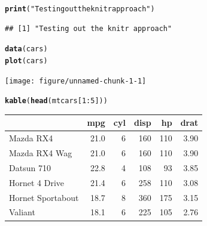 \documentclass[print]{faofactbook}\usepackage[]{graphicx}\usepackage[]{color}
\makeatletter
\newcommand{\hlnum}[1]{\textcolor[rgb]{0.686,0.059,0.569}{#1}}%
\newcommand{\hlstr}[1]{\textcolor[rgb]{0.192,0.494,0.8}{#1}}%
\newcommand{\hlopt}[1]{\textcolor[rgb]{0,0,0}{#1}}%
\newcommand{\hlstd}[1]{\textcolor[rgb]{0.345,0.345,0.345}{#1}}%
\newcommand{\hlkwd}[1]{\textcolor[rgb]{0.737,0.353,0.396}{\textbf{#1}}}%
\newenvironment{kframe}{%
 \def\at@end@of@kframe{}%
 \ifinner\ifhmode%
  \def\at@end@of@kframe{\end{minipage}}%
  \begin{minipage}{\columnwidth}%
 \fi\fi%
 \def\FrameCommand##1{\hskip\@totalleftmargin \hskip-\fboxsep
 \colorbox{shadecolor}{##1}\hskip-\fboxsep
     \hskip-\linewidth \hskip-\@totalleftmargin \hskip\columnwidth}%
 \MakeFramed {\advance\hsize-\width
   \@totalleftmargin\z@ \linewidth\hsize
   \@setminipage}}%
 {\par\unskip\endMakeFramed%
 \at@end@of@kframe}
\newenvironment{knitrout}{}{} %
\makeatother
\begin{document}


\ifprint

\else

\fi

\tableofcontents
\clearpage



\thispagestyle{empty}
\mbox{}
\clearpage

{}  %
\setlength{\parskip}{3pt plus 3pt minus 1pt}  %


\clearpage

\begin{knitrout}
\color{fgcolor}\begin{kframe}
\begin{alltt}
\hlkwd{print}\hlstd{(}\hlstr{"Testing out the knitr approach"}\hlstd{)}
\end{alltt}
\begin{verbatim}
## [1] "Testing out the knitr approach"
\end{verbatim}
\begin{alltt}
\hlkwd{data}\hlstd{(cars)}
\hlkwd{plot}\hlstd{(cars)}
\end{alltt}
\end{kframe}
\texttt{[image: figure/unnamed-chunk-1-1]} 
\begin{kframe}\begin{alltt}
\hlkwd{kable}\hlstd{(}\hlkwd{head}\hlstd{(mtcars[}\hlnum{1}\hlopt{:}\hlnum{5}\hlstd{]))}
\end{alltt}
\end{kframe}
\begin{tabular}{l|r|r|r|r|r}
\hline
  & mpg & cyl & disp & hp & drat\\
\hline
Mazda RX4 & 21.0 & 6 & 160 & 110 & 3.90\\
\hline
Mazda RX4 Wag & 21.0 & 6 & 160 & 110 & 3.90\\
\hline
Datsun 710 & 22.8 & 4 & 108 & 93 & 3.85\\
\hline
Hornet 4 Drive & 21.4 & 6 & 258 & 110 & 3.08\\
\hline
Hornet Sportabout & 18.7 & 8 & 360 & 175 & 3.15\\
\hline
Valiant & 18.1 & 6 & 225 & 105 & 2.76\\
\hline
\end{tabular}


\end{knitrout}
\end{document}
